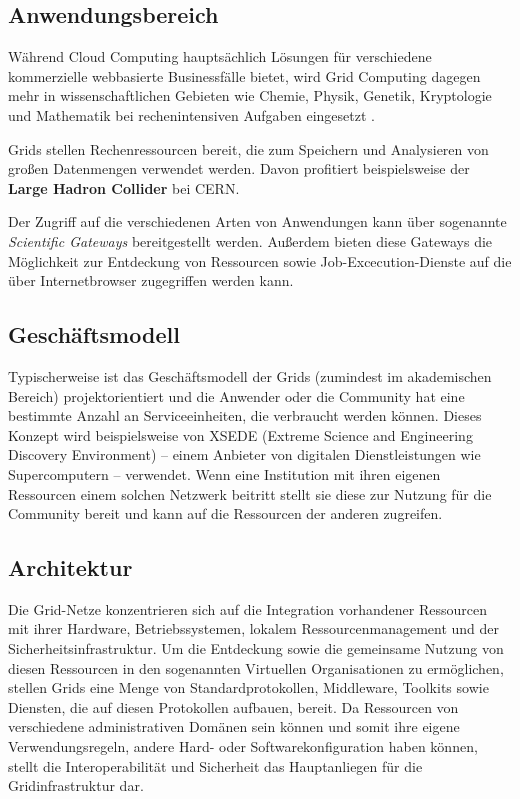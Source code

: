 \subsection{Anwendungsbereich}
Während Cloud Computing hauptsächlich Lösungen für verschiedene kommerzielle webbasierte Businessfälle bietet, wird Grid Computing dagegen mehr in wissenschaftlichen Gebieten wie Chemie, Physik, Genetik, Kryptologie und Mathematik bei rechenintensiven Aufgaben eingesetzt \cite{5623257}.

Grids stellen Rechenressourcen bereit, die zum Speichern und Analysieren von großen Datenmengen verwendet werden. Davon profitiert beispielsweise der \textbf{Large Hadron Collider} bei CERN.\cite{wlcg}

Der Zugriff auf die verschiedenen Arten von Anwendungen kann über sogenannte \textit{Scientific Gateways} bereitgestellt werden. Außerdem bieten diese Gateways die Möglichkeit zur Entdeckung von Ressourcen sowie Job-Excecution-Dienste auf die über Internetbrowser zugegriffen werden kann\cite{360-degree-compared}.

\subsection{Geschäftsmodell}
Typischerweise ist das Geschäftsmodell der Grids (zumindest im akademischen Bereich) projektorientiert und die Anwender oder die Community hat eine bestimmte Anzahl an Serviceeinheiten, die verbraucht werden können\cite{360-degree-compared}.  
Dieses Konzept wird beispielsweise von XSEDE (Extreme Science and Engineering Discovery Environment) -- einem Anbieter von digitalen Dienstleistungen wie Supercomputern -- verwendet\cite{xsede}.
Wenn eine Institution mit ihren eigenen Ressourcen einem solchen Netzwerk beitritt stellt sie diese zur Nutzung für die Community bereit und kann auf die Ressourcen der anderen zugreifen\cite{360-degree-compared}.



\subsection{Architektur}
Die Grid-Netze konzentrieren sich auf die Integration vorhandener Ressourcen mit ihrer Hardware, Betriebssystemen, lokalem Ressourcenmanagement und der Sicherheitsinfrastruktur.
Um die Entdeckung sowie die gemeinsame Nutzung von diesen Ressourcen in den sogenannten \glqq Virtuellen Organisationen\grqq{} zu ermöglichen, stellen Grids eine Menge von Standardprotokollen, Middleware, Toolkits sowie Diensten, die auf diesen Protokollen aufbauen, bereit.
Da Ressourcen von verschiedene administrativen Domänen sein können und somit ihre eigene Verwendungsregeln, andere Hard- oder Softwarekonfiguration haben können, stellt die Interoperabilität und Sicherheit das Hauptanliegen für die Gridinfrastruktur dar.\cite{360-degree-compared}

